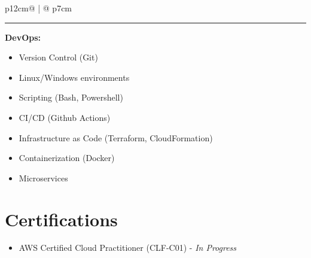 \documentclass[letterpaper, 11pt]{article}
\begin{document}
\begin{tabular}{p{12cm}@{\hspace{1em}} | @{\hspace{1em}} p{7cm}}
        \begin{adjustwidth}{2em}{2em}
                {\color{lightgray}\rule{\linewidth}{1pt}}           
        \end{adjustwidth}
        
        \vspace{3pt}
        {\large\textbf{DevOps:}}    
            \begin{itemize}
                \item Version Control (Git)
                \item Linux/Windows environments
                \item Scripting (Bash, Powershell)
                \item CI/CD (Github Actions)
                \item Infrastructure as Code (Terraform, CloudFormation)
                \item Containerization (Docker)
                \item Microservices
            \end{itemize}
            \vspace{8pt}
    \section*{Certifications}
    \begin{itemize}
        \item AWS Certified Cloud Practitioner
               (CLF-C01) - \textit{In Progress}
    \end{itemize}
\end{tabular}


    
\end{document}
